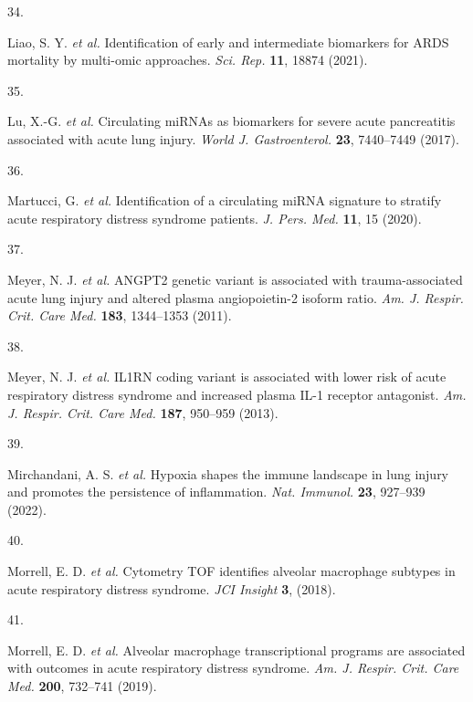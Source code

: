 \documentclass[
  11,
  a4paper,
]{article}
\newlength{\cslhangindent}
\newlength{\csllabelwidth}
\newlength{\cslentryspacingunit} %
\newenvironment{CSLReferences}[2] %
 {%
  \setlength{\parindent}{0pt}
  \ifodd #1
  \let\oldpar\par
  \def\par{\hangindent=\cslhangindent\oldpar}
  \fi
  \setlength{\parskip}{#2\cslentryspacingunit}
 }%
 {}
\newcommand{\CSLLeftMargin}[1]{\parbox[t]{\csllabelwidth}{#1}}
\newcommand{\CSLRightInline}[1]{\parbox[t]{\linewidth - \csllabelwidth}{#1}\break}
\begin{document}
\begin{CSLReferences}{0}{0}
\leavevmode{}%
\CSLLeftMargin{34. }%
\CSLRightInline{Liao, S. Y. \emph{et al.} Identification of early and
intermediate biomarkers for {ARDS} mortality by multi-omic approaches.
\emph{Sci. Rep.} \textbf{11}, 18874 (2021).}

\leavevmode{}%
\CSLLeftMargin{35. }%
\CSLRightInline{Lu, X.-G. \emph{et al.} Circulating {miRNAs} as
biomarkers for severe acute pancreatitis associated with acute lung
injury. \emph{World J. Gastroenterol.} \textbf{23}, 7440--7449 (2017).}

\leavevmode{}%
\CSLLeftMargin{36. }%
\CSLRightInline{Martucci, G. \emph{et al.} Identification of a
circulating {miRNA} signature to stratify acute respiratory distress
syndrome patients. \emph{J. Pers. Med.} \textbf{11}, 15 (2020).}

\leavevmode{}%
\CSLLeftMargin{37. }%
\CSLRightInline{Meyer, N. J. \emph{et al.} {ANGPT2} genetic variant is
associated with trauma-associated acute lung injury and altered plasma
angiopoietin-2 isoform ratio. \emph{Am. J. Respir. Crit. Care Med.}
\textbf{183}, 1344--1353 (2011).}

\leavevmode{}%
\CSLLeftMargin{38. }%
\CSLRightInline{Meyer, N. J. \emph{et al.} {IL1RN} coding variant is
associated with lower risk of acute respiratory distress syndrome and
increased plasma {IL-1} receptor antagonist. \emph{Am. J. Respir. Crit.
Care Med.} \textbf{187}, 950--959 (2013).}

\leavevmode{}%
\CSLLeftMargin{39. }%
\CSLRightInline{Mirchandani, A. S. \emph{et al.} Hypoxia shapes the
immune landscape in lung injury and promotes the persistence of
inflammation. \emph{Nat. Immunol.} \textbf{23}, 927--939 (2022).}

\leavevmode{}%
\CSLLeftMargin{40. }%
\CSLRightInline{Morrell, E. D. \emph{et al.} Cytometry {TOF} identifies
alveolar macrophage subtypes in acute respiratory distress syndrome.
\emph{JCI Insight} \textbf{3}, (2018).}

\leavevmode{}%
\CSLLeftMargin{41. }%
\CSLRightInline{Morrell, E. D. \emph{et al.} Alveolar macrophage
transcriptional programs are associated with outcomes in acute
respiratory distress syndrome. \emph{Am. J. Respir. Crit. Care Med.}
\textbf{200}, 732--741 (2019).}


\end{CSLReferences}
\end{document}
